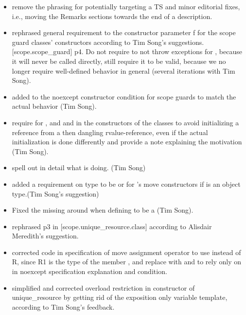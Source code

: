\documentclass[ebook,11pt,article]{memoir}
\begin{document}
\begin{itemize}
\item remove the phrasing for potentially targeting a TS and minor editorial fixes, i.e., moving the Remarks sections towards the end of a description.
\item rephrased general requirement to the constructor parameter f for the scope guard classes' constructors according to Tim Song's suggestions. [scope.scope_guard] p4. Do not require  to not throw exceptions for , because it will never be called directly, still require it to be valid, because we no longer require well-defined behavior in general (several iterations with Tim Song).
\item added  to the noexcept constructor condition for scope guards to match the actual behavior (Tim Song).
\item require  for , and  and  in the constructors of the classes to avoid initializing a reference from a then dangling rvalue-reference, even if the actual initialization is done differently and provide a note explaining the motivation (Tim Song). 
\item spell out in detail what  is doing. (Tim Song)
\item added a requirement on type  to be  or  for 's move constructors if  is an object type.(Tim Song's suggestion)
\item Fixed the missing  around  when defining  to be a  (Tim Song).
\item rephrased p3 in [scope.unique_resource.class] according to Alisdair Meredith's suggestion.
\item corrected code in specification of  move assignment operator to use  instead of R, since R1 is the type of the member , and replace  with  and to rely only on  in noexcept specification explanation and  condition.
\item simplified and corrected overload restriction in constructor of unique_resource by getting rid of the exposition only variable template,  according to Tim Song's feedback.

\end{itemize}
\end{document}
